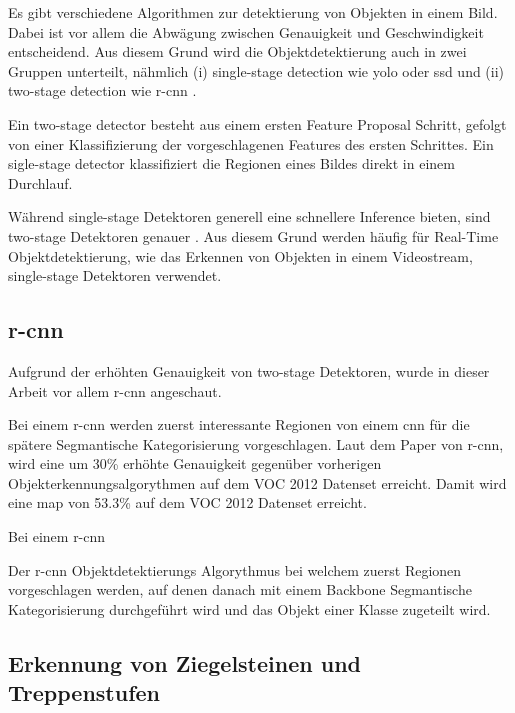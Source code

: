 Es gibt verschiedene Algorithmen zur detektierung von Objekten in einem Bild. 
Dabei ist vor allem die Abwägung zwischen Genauigkeit und Geschwindigkeit entscheidend.
Aus diesem Grund wird die Objektdetektierung auch in zwei Gruppen unterteilt, nähmlich 
(i) single-stage detection wie \acrshort{yolo} \cite{redmon2016look} oder \acrshort{ssd} \cite{Liu_2016} und (ii) two-stage detection wie \acrfull{r-cnn} \cite{girshick2015fast}.

Ein two-stage detector besteht aus einem ersten Feature Proposal Schritt, gefolgt von einer Klassifizierung der 
vorgeschlagenen Features des ersten Schrittes. Ein sigle-stage detector klassifiziert die Regionen eines Bildes
direkt in einem Durchlauf. 

Während single-stage Detektoren generell eine schnellere Inference bieten, sind two-stage Detektoren genauer \cite{soviany2018optimizing}.
Aus diesem Grund werden häufig für Real-Time Objektdetektierung, wie das Erkennen von Objekten in einem Videostream, single-stage
Detektoren verwendet.

\subsection{\acrfull{r-cnn}}

Aufgrund der erhöhten Genauigkeit von two-stage Detektoren, wurde in dieser Arbeit vor allem \acrshort{r-cnn} angeschaut.

Bei einem \acrshort{r-cnn} \cite{girshick2014rich} werden zuerst interessante Regionen von einem \acrshort{cnn} für die 
spätere Segmantische Kategorisierung vorgeschlagen. Laut dem Paper von \acrshort{r-cnn}, wird eine um 30\% erhöhte Genauigkeit 
gegenüber vorherigen Objekterkennungsalgorythmen auf dem VOC 2012 Datenset erreicht. Damit wird eine \acrfull{map} von 53.3\%
auf dem VOC 2012 Datenset erreicht.

Bei einem \acrshort{r-cnn} 

{
  Der \acrfull{r-cnn} \cite{girshick2014rich} Objektdetektierungs Algorythmus bei welchem zuerst Regionen 
  vorgeschlagen werden, auf denen danach mit einem Backbone Segmantische Kategorisierung durchgeführt wird und
  das Objekt einer Klasse zugeteilt wird.
}

\subsection{Erkennung von Ziegelsteinen und Treppenstufen}

